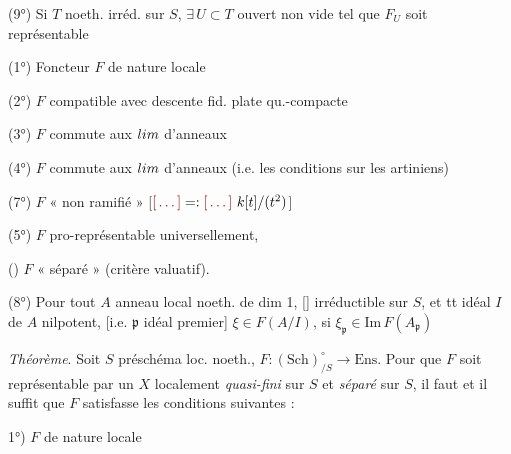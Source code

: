 \documentclass[11pt,a4paper]{article}
\begin{document}
(9°) Si $T$ noeth. irréd. sur $S$, $\exists\, U \subset T$ ouvert non vide
tel que $F_U$ soit représentable


(1°) Foncteur $F$ de nature locale

(2°) $F$ compatible avec descente fid. plate qu.-compacte

(3°) $F$ commute aux $\varinjlim$ d'anneaux

(4°) $F$ commute aux $\varprojlim$ d'anneaux 
(i.e. les conditions   sur les
artiniens)

(7°) $F$ « non ramifié »  [$\ill{} = : \ill{}\ k[t]/(t^2)$]


(5°) $F$ pro-représentable universellement, \struck{\ill{}}

() $F$ « séparé » (critère valuatif).

(8°) Pour tout $A$ anneau local noeth. de dim 1, []
irréductible sur $S$, et tt idéal $I$ de $A$ nilpotent, [i.e.
\ill{} $\mathfrak{p}$ idéal premier]  $\xi \in F(A/I)$, si
$\xi_{\mathfrak{p}} \in \mathrm{Im}\, F(A_{\mathfrak{p}})$
 \struck{\ill{}}

\emph{Théorème}. Soit $S$ préschéma loc. noeth.,
$F : (\mathrm{Sch})_{/S}^{\circ} \to \mathrm{Ens}$. Pour que $F$ soit
représentable par un $X$ localement \emph{quasi-fini} sur $S$ et
\emph{séparé} sur $S$, il faut et il suffit que $F$ satisfasse les
conditions suivantes :

1°) $F$ de nature locale
\end{document}
